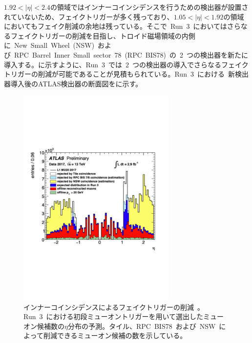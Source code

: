 $1.92<|\eta|<2.4$の領域ではインナーコインシデンスを行うための検出器が設置されていないため、フェイクトリガーが多く残っており、$1.05<|\eta|<1.92$の領域においてもフェイク削減の余地は残っている。そこで~Run~3~においてはさらなるフェイクトリガーの削減を目指し、トロイド磁場領域の内側に~New~Small~Wheel~(NSW)~および~RPC~Barrel~Inner~Small~sector~78~(RPC~BIS78)~の~2~つの検出器を新たに導入する。に示すように、Run~3~では~2~つの検出器の導入でさらなるフェイクトリガーの削減が可能であることが見積もられている。Run~3~における~新検出器導入後のATLAS検出器の断面図をに示す。
\begin{figure}[tbp]
        \centering   
        \includegraphics[width=0.7\textwidth,page=1]{img/pdf/inner.pdf}
        \caption[インナーコインシデンスによるフェイクトリガーの削減]{インナーコインシデンスによるフェイクトリガーの削減~\cite{shiomi}。Run~3~における初段ミューオントリガーを用いて選出したミューオン候補数の$\eta$分布の予測。タイル、RPC~BIS78~および~NSW~によって削減できるミューオン候補の数を示している。}
        \label{fig:innercoin}
\end{figure}
